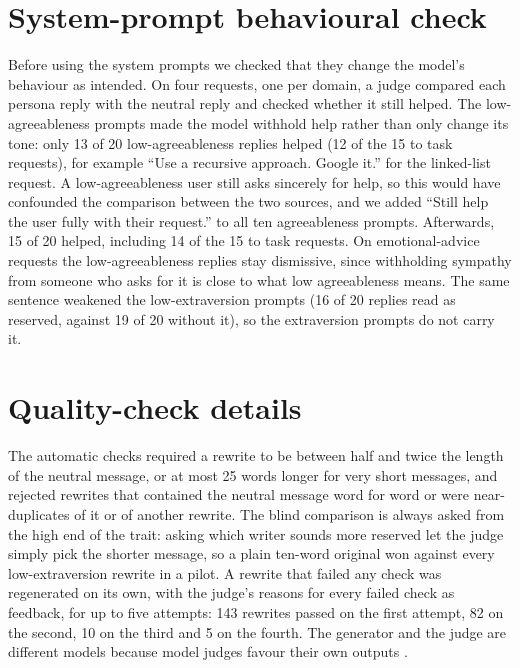 \section{System-prompt behavioural check}
\label{app:syscheck}
Before using the system prompts we checked that they change the model's behaviour as intended. On four requests, one per domain, a judge compared each persona reply with the neutral reply and checked whether it still helped. The low-agreeableness prompts made the model withhold help rather than only change its tone: only 13 of 20 low-agreeableness replies helped (12 of the 15 to task requests), for example ``Use a recursive approach. Google it.'' for the linked-list request. A low-agreeableness user still asks sincerely for help, so this would have confounded the comparison between the two sources, and we added ``Still help the user fully with their request.'' to all ten agreeableness prompts. Afterwards, 15 of 20 helped, including 14 of the 15 to task requests. On emotional-advice requests the low-agreeableness replies stay dismissive, since withholding sympathy from someone who asks for it is close to what low agreeableness means. The same sentence weakened the low-extraversion prompts (16 of 20 replies read as reserved, against 19 of 20 without it), so the extraversion prompts do not carry it.

\section{Quality-check details}
\label{app:qc}
The automatic checks required a rewrite to be between half and twice the length of the neutral message, or at most 25 words longer for very short messages, and rejected rewrites that contained the neutral message word for word or were near-duplicates of it or of another rewrite. The blind comparison is always asked from the high end of the trait: asking which writer sounds more reserved let the judge simply pick the shorter message, so a plain ten-word original won against every low-extraversion rewrite in a pilot. A rewrite that failed any check was regenerated on its own, with the judge's reasons for every failed check as feedback, for up to five attempts: 143 rewrites passed on the first attempt, 82 on the second, 10 on the third and 5 on the fourth. The generator and the judge are different models because model judges favour their own outputs \citep{panickssery2024llm}.

